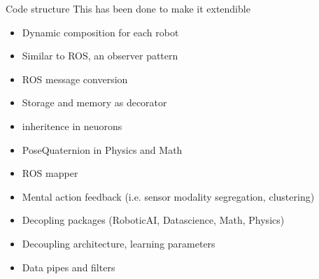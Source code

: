 \begin{frame}[allowframebreaks]{Code structure}
    This has been done to make it extendible
    \begin{itemize}
        \item Dynamic composition for each robot
        \item Similar to ROS, an observer pattern
        \item ROS message conversion
        \item Storage and memory as decorator
        \item inheritence in neuorons
        \item PoseQuaternion in Physics and Math
        \item ROS mapper
        \item Mental action feedback (i.e. sensor modality segregation, clustering)
        \item Decopling packages (RoboticAI, Datascience, Math, Physics)
        \item Decoupling architecture,  learning parameters
        \item Data pipes and filters
    
    \end{itemize}
\end{frame}